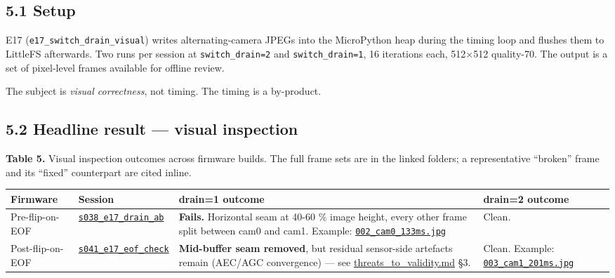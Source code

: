 \subsection{5.1 Setup}\label{setup-3}

E17 (\texttt{e17\_switch\_drain\_visual}) writes alternating-camera
JPEGs into the MicroPython heap during the timing loop and flushes them
to LittleFS afterwards. Two runs per session at \texttt{switch\_drain=2}
and \texttt{switch\_drain=1}, 16 iterations each, 512×512 quality-70.
The output is a set of pixel-level frames available for offline review.

The subject is \emph{visual correctness}, not timing. The timing is a
by-product.

\subsection{5.2 Headline result --- visual
inspection}\label{headline-result-visual-inspection}

\textbf{Table 5.} Visual inspection outcomes across firmware builds. The
full frame sets are in the linked folders; a representative ``broken''
frame and its ``fixed'' counterpart are cited inline.

{\def\LTcaptype{none} %
\begin{longtable}[]{@{}
  >{\raggedright\arraybackslash}p{}
  >{\raggedright\arraybackslash}p{}
  >{\raggedright\arraybackslash}p{}
  >{\raggedright\arraybackslash}p{}@{}}
\toprule\noalign{}
\begin{minipage}[b]{\linewidth}\raggedright
Firmware
\end{minipage} & \begin{minipage}[b]{\linewidth}\raggedright
Session
\end{minipage} & \begin{minipage}[b]{\linewidth}\raggedright
drain=1 outcome
\end{minipage} & \begin{minipage}[b]{\linewidth}\raggedright
drain=2 outcome
\end{minipage} \\
\midrule\noalign{}
\endhead
\bottomrule\noalign{}
\endlastfoot
Pre-flip-on-EOF &
\href{../experiments/s038_e17_drain_ab/}{\texttt{s038\_e17\_drain\_ab}}
& \textbf{Fails.} Horizontal seam at 40-60 \% image height, every other
frame split between cam0 and cam1. Example:
\href{../experiments/s038_e17_drain_ab/e17_t1_frames/002_cam0_133ms.jpg}{\texttt{002\_cam0\_133ms.jpg}}
& Clean. \\
Post-flip-on-EOF &
\href{../experiments/s041_e17_eof_check/}{\texttt{s041\_e17\_eof\_check}}
& \textbf{Mid-buffer seam removed}, but residual sensor-side artefacts
remain (AEC/AGC convergence) --- see \url{threats_to_validity.md} §3. &
Clean. Example:
\href{../experiments/s041_e17_eof_check/e17_t1_frames/003_cam1_201ms.jpg}{\texttt{003\_cam1\_201ms.jpg}} \\
\end{longtable}
}

